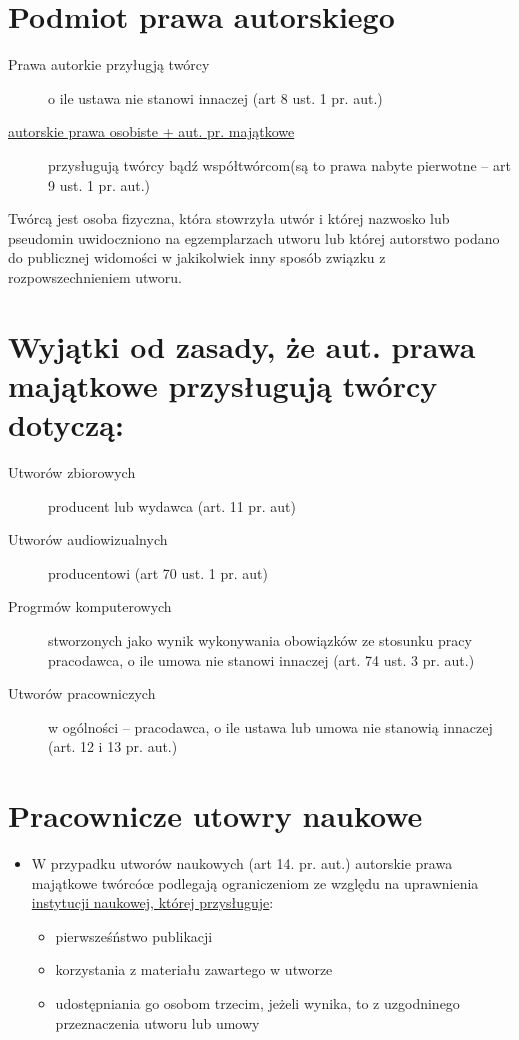 \documentclass[11pt]{article}
\begin{document}
\section{Podmiot prawa autorskiego}
\label{sec:org45da284}
\begin{description}
\item[{Prawa autorkie przyługją twórcy}] o ile ustawa nie stanowi innaczej (art 8 ust. 1 pr. aut.)
\item[{\uline{autorskie prawa osobiste + aut. pr. majątkowe}}] przysługują twórcy bądź współtwórcom(są to prawa nabyte pierwotne -- art 9 ust. 1 pr. aut.)
\end{description}
Twórcą jest osoba fizyczna, która stowrzyła utwór i której nazwosko lub pseudomin uwidoczniono na egzemplarzach utworu lub której autorstwo podano do publicznej widomości w jakikolwiek inny sposób związku z rozpowszechnieniem utworu.
\section{Wyjątki od zasady, że aut. prawa majątkowe przysługują twórcy dotyczą:}
\label{sec:org429f858}
\begin{description}
\item[{Utworów zbiorowych}] producent lub wydawca (art. 11 pr. aut)
\item[{Utworów audiowizualnych}] producentowi (art 70 ust. 1 pr. aut)
\item[{Progrmów komputerowych}] stworzonych jako wynik wykonywania obowiązków ze stosunku pracy pracodawca, o ile umowa nie stanowi innaczej (art. 74 ust. 3 pr. aut.)
\item[{Utworów pracowniczych}] w ogólności -- pracodawca, o ile ustawa lub umowa nie stanowią innaczej (art. 12 i 13 pr. aut.)
\end{description}
\section{Pracownicze utowry naukowe}
\label{sec:org293505b}
\begin{itemize}
\item W przypadku utworów naukowych (art 14. pr. aut.) autorskie prawa majątkowe twórcóœ podlegają ograniczeniom ze względu na uprawnienia \uline{instytucji naukowej, której przysługuje}:
\begin{itemize}
\item pierwsześństwo publikacji
\item korzystania z materiału zawartego w utworze
\item udostępniania go osobom trzecim, jeżeli wynika, to z uzgodninego przeznaczenia utworu lub umowy
\end{itemize}
\end{itemize}
\end{document}
